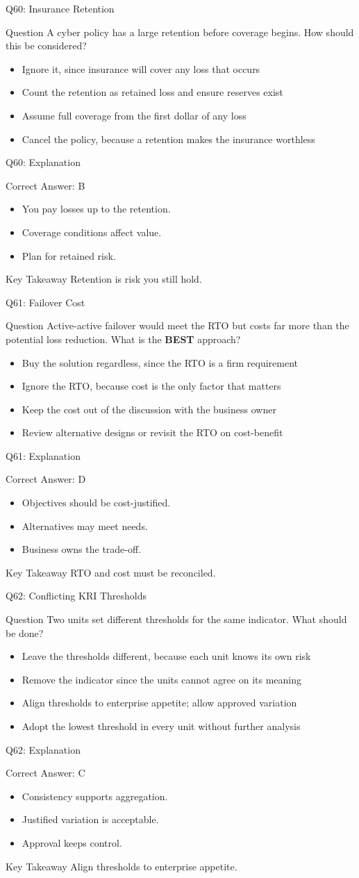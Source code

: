 \documentclass[aspectratio=169]{beamer}
\newcommand{\hq}[7]{%
	\begin{frame}{Q#1: #2}
		\begin{block}{Question}
			#3
		\end{block}
		\begin{itemize}
			#4
		\end{itemize}
	\end{frame}
	\begin{frame}{Q#1: Explanation}
		\begin{block}{Correct Answer: #5}
			\begin{itemize}
				#6
			\end{itemize}
		\end{block}
		\begin{alertblock}{Key Takeaway}
			#7
		\end{alertblock}
	\end{frame}
}
\begin{document}
	\hq{60}{Insurance Retention}
	{A cyber policy has a large retention before coverage begins. How should this be considered?}
	{\item[\textbf{(A)}] Ignore it, since insurance will cover any loss that occurs
		\item[\textbf{(B)}] Count the retention as retained loss and ensure reserves exist
		\item[\textbf{(C)}] Assume full coverage from the first dollar of any loss
		\item[\textbf{(D)}] Cancel the policy, because a retention makes the insurance worthless}
	{B}
	{\item You pay losses up to the retention.
		\item Coverage conditions affect value.
		\item Plan for retained risk.}
	{Retention is risk you still hold.}

	\hq{61}{Failover Cost}
	{Active-active failover would meet the RTO but costs far more than the potential loss reduction. What is the \textbf{BEST} approach?}
	{\item[\textbf{(A)}] Buy the solution regardless, since the RTO is a firm requirement
		\item[\textbf{(B)}] Ignore the RTO, because cost is the only factor that matters
		\item[\textbf{(C)}] Keep the cost out of the discussion with the business owner
		\item[\textbf{(D)}] Review alternative designs or revisit the RTO on cost-benefit}
	{D}
	{\item Objectives should be cost-justified.
		\item Alternatives may meet needs.
		\item Business owns the trade-off.}
	{RTO and cost must be reconciled.}

	\hq{62}{Conflicting KRI Thresholds}
	{Two units set different thresholds for the same indicator. What should be done?}
	{\item[\textbf{(A)}] Leave the thresholds different, because each unit knows its own risk
		\item[\textbf{(B)}] Remove the indicator since the units cannot agree on its meaning
		\item[\textbf{(C)}] Align thresholds to enterprise appetite; allow approved variation
		\item[\textbf{(D)}] Adopt the lowest threshold in every unit without further analysis}
	{C}
	{\item Consistency supports aggregation.
		\item Justified variation is acceptable.
		\item Approval keeps control.}
	{Align thresholds to enterprise appetite.}
\end{document}

